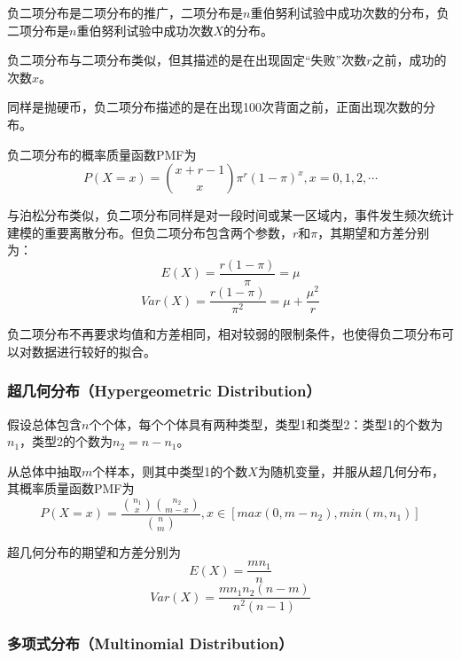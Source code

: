 负二项分布是二项分布的推广，二项分布是$n$重伯努利试验中成功次数的分布，负二项分布是$n$重伯努利试验中成功次数$X$的分布。

负二项分布与二项分布类似，但其描述的是在出现固定“失败”次数$r$之前，成功的次数$x$。

\begin{example}
    同样是抛硬币，负二项分布描述的是在出现100次背面之前，正面出现次数的分布。
\end{example}

负二项分布的概率质量函数PMF为
\begin{equation}
    P(X = x) = \binom{x+r-1}{x}\pi^r(1-\pi)^x, x = 0,1,2,\cdots
\end{equation}

与泊松分布类似，负二项分布同样是对一段时间或某一区域内，事件发生频次统计建模的重要离散分布。但负二项分布包含两个参数，$r$和$π$，其期望和方差分别为：
\begin{equation}
    E(X) = \frac{r(1-\pi)}{\pi} = \mu
\end{equation}
\begin{equation}
    Var(X) = \frac{r(1-\pi)}{\pi^2} = \mu + \frac{\mu^2}{r}
\end{equation}

负二项分布不再要求均值和方差相同，相对较弱的限制条件，也使得负二项分布可以对数据进行较好的拟合。

\subsubsection{超几何分布（Hypergeometric Distribution）}

假设总体包含$n$个个体，每个个体具有两种类型，类型1和类型2：类型1的个数为$n_1$，类型2的个数为$n_2=n-n_1$。

从总体中抽取$m$个样本，则其中类型1的个数$X$为随机变量，并服从超几何分布，其概率质量函数PMF为
\begin{equation}
    P(X = x) = \frac{\binom{n_1}{x}\binom{n_2}{m-x}}{\binom{n}{m}}, x \in [max(0, m-n_2), min(m, n_1)]
\end{equation}

超几何分布的期望和方差分别为
\begin{equation}
    E(X) = \frac{mn_1}{n}
\end{equation}
\begin{equation}
    Var(X) = \frac{mn_1n_2(n-m)}{n^2(n-1)}
\end{equation}

\subsubsection{多项式分布（Multinomial Distribution）}

